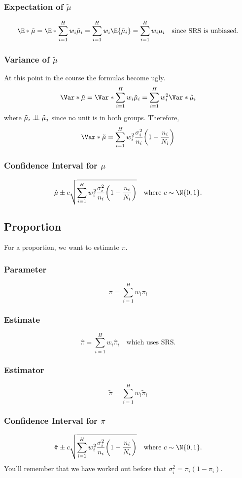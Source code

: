 \subsubsection*{Expectation of $ \tilde{\mu} $}
\[ \E*{\tilde{\mu}}=\E*{\sum_{i=1}^{H} w_i\tilde{\mu}_i}=\sum_{i=1}^{H} w_i\E{\tilde{\mu}_i}=
    \sum_{i=1}^{H} w_i \mu_i\quad\text{since SRS is unbiased.} \]
\subsubsection*{Variance of $ \tilde{\mu} $}
At this point in the course the formulas become ugly.
\[ \Var*{\tilde{\mu}}=\Var*{\sum_{i=1}^{H} w_i\tilde{\mu}_i}=\sum_{i=1}^{H} w_i^2\Var*{\tilde{\mu}_i} \]
where $ \tilde{\mu}_i\perp\!\!\!\perp \tilde{\mu}_j $ since no unit is in both groups. Therefore,
\[ \Var*{\tilde{\mu}}=\sum_{i=1}^{H}w_i^2 \frac{\sigma_i^2}{n_i} \biggl(1-\frac{n_i}{N_i} \biggr) \]
\subsubsection*{Confidence Interval for $ \mu $}
\[ \hat{\mu}\pm c\sqrt{\sum_{i=1}^{H}w_i^2 \frac{\sigma_i^2}{n_i} \biggl(1-\frac{n_i}{N_i} \biggr)}\quad\text{where $ c \sim \N{0,1} $.} \]
\subsection*{Proportion}
For a proportion, we want to estimate $ \pi $.
\subsubsection*{Parameter}
\[ \pi=\sum_{i=1}^{H} w_i \pi_i \]
\subsubsection*{Estimate}
\[ \hat{\pi}=\sum_{i=1}^{H} w_i\hat{\pi}_i\quad\text{which uses SRS.} \]
\subsubsection*{Estimator}
\[ \tilde{\pi}=\sum_{i=1}^{H} w_i\tilde{\pi}_i \]
\subsubsection*{Confidence Interval for $ \pi $}
\[ \hat{\pi}\pm c\sqrt{\sum_{i=1}^{H}w_i^2 \frac{\sigma_i^2}{n_i} \biggl(1-\frac{n_i}{N_i} \biggr)}\quad\text{where $ c \sim \N{0,1} $.} \]
You'll remember that we have worked out before that $ \sigma_i^2=\pi_i(1-\pi_i) $.
